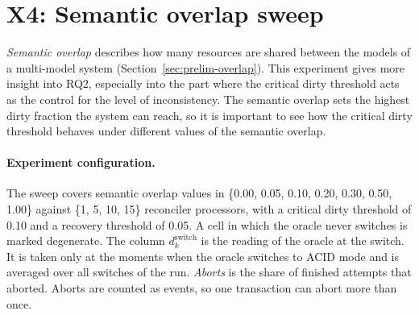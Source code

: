 \section{X4: Semantic overlap sweep}\label{sec:x4-overlap-sweep}

\emph{Semantic overlap} describes how many resources are shared between the models of a multi-model system (Section~\ref{sec:prelim-overlap}). This experiment gives more insight into RQ2, especially into the part where
the critical dirty threshold acts as the control for the level of inconsistency.
The semantic overlap sets the highest dirty fraction the system can reach, so it
is important to see how the critical dirty threshold behaves under
different values of the semantic overlap.

\paragraph{Experiment configuration.} The sweep covers semantic overlap values
in \{0.00, 0.05, 0.10, 0.20, 0.30, 0.50, 1.00\} against \{1, 5, 10, 15\}
reconciler processors, with a critical dirty threshold of 0.10 and a recovery
threshold of 0.05. A cell in which the oracle never switches is marked
degenerate. The column $d_k^{\mathrm{switch}}$ is the reading of the oracle at
the switch. It is taken only at the moments when the oracle switches to ACID
mode and is averaged over all switches of the run. \emph{Aborts} is the share
of finished attempts that aborted. Aborts are counted as events, so one
transaction can abort more than once.

